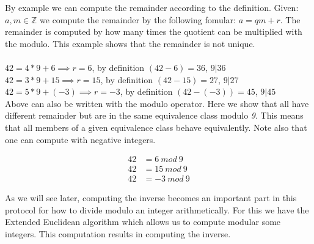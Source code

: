  By example we can compute the remainder according to the definition. Given: \begin{math} a, m \in \mathbb{Z} \end{math} we compute the remainder by the following fomular:  \begin{math} a = qm +r \end{math}. The remainder is computed by how many times the quotient can be multiplied with the modulo. This example shows that the remainder is not unique. \\\\
\begin{math}42 = 4 * 9 +6 \implies r = 6 \end{math}, by definition \begin{math} (42-6) = 36 \end{math}, \begin{math} 9| 36 \end{math}\\
\begin{math}42 = 3 * 9 +15 \implies r = 15 \end{math}, by definition \begin{math} (42-15) = 27 \end{math}, \begin{math} 9| 27 \end{math}\\
\begin{math}42 = 5 * 9 +(-3) \implies r = -3 \end{math}, by definition \begin{math} (42-(-3)) = 45 \end{math}, \begin{math} 9| 45 \end{math}\\

 Above can also be written with the modulo operator. Here we show that all have different remainder but are in the same equivalence class modulo \textit{9}. This means that all members of a given equivalence class behave equivalently. Note also that one can compute with negative integers.

\begin{align*}
42 &= 6 \ mod \ 9 \\
42 &= 15 \ mod \ 9 \\
42 &= -3 \ mod \ 9 
\end{align*}

As we will see later, computing the inverse becomes an important part in this protocol for how to divide modulo an integer arithmetically. For this we have the Extended Euclidean algorithm which allows us to compute modular some integers. This computation results in computing the inverse.


